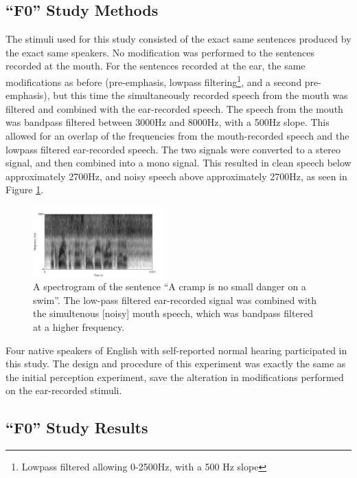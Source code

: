 \documentclass[dissertation,copyright]{uathesis}
\begin{document}
\subsection{``F0'' Study Methods}
\label{F0-methods}

The stimuli used for this study consisted of the exact same sentences produced by the exact same speakers.  No modification was performed to the sentences recorded at the mouth.  For the sentences recorded at the ear, the same modifications as before (pre-emphasis, lowpass filtering\footnote{Lowpass filtered allowing 0-2500Hz, with a 500 Hz slope}, and a second pre-emphasis), but this time the simultaneously recorded speech from the mouth was filtered and combined with the ear-recorded speech.  The speech from the mouth was bandpass filtered between 3000Hz and 8000Hz, with a 500Hz slope.  This allowed for an overlap of the frequencies from the mouth-recorded speech and the lowpass filtered ear-recorded speech.  The two signals were converted to a stereo signal, and then combined into a mono signal.  This resulted in clean speech below approximately 2700Hz, and noisy speech above approximately 2700Hz, as seen in Figure \ref{fig:combined-signal}.
%
\begin{figure}
\centering
  \includegraphics[width=0.45\textwidth]{figure/combined-signal.png}
  \caption{A spectrogram of the sentence ``A cramp is no small danger on a swim''.  The low-pass filtered ear-recorded signal was combined with the simultenous [noisy] mouth speech, which was bandpass filtered at a higher frequency.}
  \label{fig:combined-signal}
\end{figure}
%

Four native speakers of English with self-reported normal hearing participated in this study.  The design and procedure of this experiment was exactly the same as the initial perception experiment, save the alteration in modifications performed on the ear-recorded stimuli.


\subsection{``F0'' Study Results}
\end{document}
